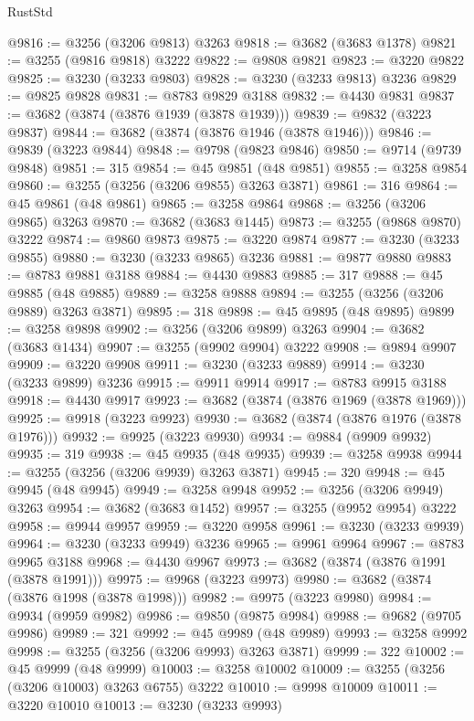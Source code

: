 \begin{lexlean}{RustStd}
\begin{coremodule}
{\begin{coremodule}
{{{{{{{{{{{{{{{{{{{{{{{{{{{{{{{{{{{{{@9816 := @3256 (@3206 @9813) @3263
@9818 := @3682 (@3683 @1378)
@9821 := @3255 (@9816 @9818) @3222
@9822 := @9808 @9821
@9823 := @3220 @9822
@9825 := @3230 (@3233 @9803)
@9828 := @3230 (@3233 @9813) @3236
@9829 := @9825 @9828
@9831 := @8783 @9829 @3188
@9832 := @4430 @9831
@9837 := @3682 (@3874 (@3876 @1939 (@3878 @1939)))
@9839 := @9832 (@3223 @9837)
@9844 := @3682 (@3874 (@3876 @1946 (@3878 @1946)))
@9846 := @9839 (@3223 @9844)
@9848 := @9798 (@9823 @9846)
@9850 := @9714 (@9739 @9848)
@9851 := 315
@9854 := @45 @9851 (@48 @9851)
@9855 := @3258 @9854
@9860 := @3255 (@3256 (@3206 @9855) @3263 @3871)
@9861 := 316
@9864 := @45 @9861 (@48 @9861)
@9865 := @3258 @9864
@9868 := @3256 (@3206 @9865) @3263
@9870 := @3682 (@3683 @1445)
@9873 := @3255 (@9868 @9870) @3222
@9874 := @9860 @9873
@9875 := @3220 @9874
@9877 := @3230 (@3233 @9855)
@9880 := @3230 (@3233 @9865) @3236
@9881 := @9877 @9880
@9883 := @8783 @9881 @3188
@9884 := @4430 @9883
@9885 := 317
@9888 := @45 @9885 (@48 @9885)
@9889 := @3258 @9888
@9894 := @3255 (@3256 (@3206 @9889) @3263 @3871)
@9895 := 318
@9898 := @45 @9895 (@48 @9895)
@9899 := @3258 @9898
@9902 := @3256 (@3206 @9899) @3263
@9904 := @3682 (@3683 @1434)
@9907 := @3255 (@9902 @9904) @3222
@9908 := @9894 @9907
@9909 := @3220 @9908
@9911 := @3230 (@3233 @9889)
@9914 := @3230 (@3233 @9899) @3236
@9915 := @9911 @9914
@9917 := @8783 @9915 @3188
@9918 := @4430 @9917
@9923 := @3682 (@3874 (@3876 @1969 (@3878 @1969)))
@9925 := @9918 (@3223 @9923)
@9930 := @3682 (@3874 (@3876 @1976 (@3878 @1976)))
@9932 := @9925 (@3223 @9930)
@9934 := @9884 (@9909 @9932)
@9935 := 319
@9938 := @45 @9935 (@48 @9935)
@9939 := @3258 @9938
@9944 := @3255 (@3256 (@3206 @9939) @3263 @3871)
@9945 := 320
@9948 := @45 @9945 (@48 @9945)
@9949 := @3258 @9948
@9952 := @3256 (@3206 @9949) @3263
@9954 := @3682 (@3683 @1452)
@9957 := @3255 (@9952 @9954) @3222
@9958 := @9944 @9957
@9959 := @3220 @9958
@9961 := @3230 (@3233 @9939)
@9964 := @3230 (@3233 @9949) @3236
@9965 := @9961 @9964
@9967 := @8783 @9965 @3188
@9968 := @4430 @9967
@9973 := @3682 (@3874 (@3876 @1991 (@3878 @1991)))
@9975 := @9968 (@3223 @9973)
@9980 := @3682 (@3874 (@3876 @1998 (@3878 @1998)))
@9982 := @9975 (@3223 @9980)
@9984 := @9934 (@9959 @9982)
@9986 := @9850 (@9875 @9984)
@9988 := @9682 (@9705 @9986)
@9989 := 321
@9992 := @45 @9989 (@48 @9989)
@9993 := @3258 @9992
@9998 := @3255 (@3256 (@3206 @9993) @3263 @3871)
@9999 := 322
@10002 := @45 @9999 (@48 @9999)
@10003 := @3258 @10002
@10009 := @3255 (@3256 (@3206 @10003) @3263 @6755) @3222
@10010 := @9998 @10009
@10011 := @3220 @10010
@10013 := @3230 (@3233 @9993)
}}}}}}}}}}}}}}}}}}}}}}}}}}}}}}}}}}}}}
\end{coremodule}}
\end{coremodule}
\end{lexlean}
